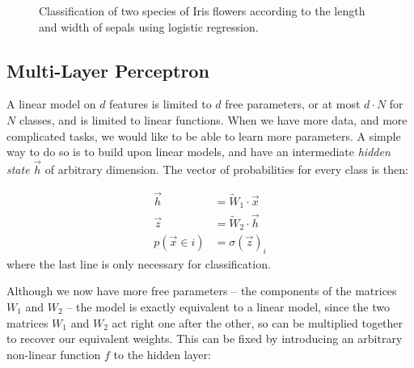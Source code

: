 \begin{figure}
	\centering
	\caption{Classification of two species of Iris flowers according to the length and width of sepals using logistic regression.}\label{fig:logistic}
\end{figure}


\subsection{Multi-Layer Perceptron}\label{sec:mlp}
A linear model on $d$ features is limited to $d$ free parameters, or at most $d \cdot N$ for $N$ classes, and is limited to linear functions.
When we have more data, and more complicated tasks, we would like to be able to learn more parameters.
A simple way to do so is to build upon linear models, and have an intermediate \emph{hidden state} $\vec{h}$ of arbitrary dimension.
The vector of probabilities for every class is then:

\begin{align*}
\vec{h} &= \widetilde W_1 \cdot \vec{x} \\
\vec{z} &= \widetilde W_2 \cdot \vec{h} \\
p(\vec x \in i) &= \sigma(\vec z)_i
\end{align*}
where the last line is only necessary for classification.

Although we now have more free parameters -- the components of the matrices $W_1$ and $W_2$ -- the model is exactly equivalent to a linear model, since the two matrices $W_1$ and $W_2$ act right one after the other, so can be multiplied together to recover our equivalent weights.
This can be fixed by introducing an arbitrary non-linear function $f$ to the hidden layer:

